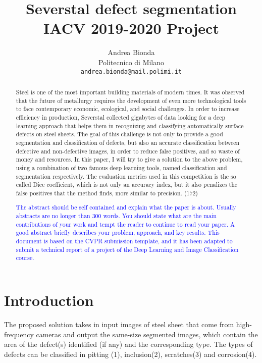 \documentclass[10pt,twocolumn,letterpaper]{article}
\begin{document}
\title{Severstal defect segmentation \\ IACV 2019-2020 Project} 

\author{Andrea Bionda\\
Politecnico di Milano\\
{\tt\small andrea.bionda@mail.polimi.it}}

\maketitle

\begin{abstract}
   Steel is one of the most important building materials of modern times. It was observed that the future of metallurgy requires the development of even more technological tools to face contemporary economic, ecological, and social challenges. 
   In order to increase efficiency in production, Severstal collected gigabytes of data looking for a deep learning approach that helps them in recognizing and classifying automatically surface defects on steel sheets.
   The goal of this challenge is not only to provide a good segmentation and classification of defects, but also an accurate classification between defective and non-defective images, in order to reduce false positives, and so waste of money and resources.
   In this paper, I will try to give a solution to the above problem, using a combination of two famous deep learning tools, named classification and segmentation respectively.
   The evaluation metrics used in this competition is the so called Dice coefficient, which is not only an accuracy index, but it also penalizes the false positives that the method finds, more similar to precision. (172)

   \textcolor{blue}{
   The abstract should be self contained and explain what the paper is about. Usually abstracts are no longer than 300 words. You should state what are the main contributions of your work and tempt the reader to continue to read your paper. A good abstract briefly describes your problem, approach, and key results. This document is based on the CVPR submission template, and it has been adapted to submit a technical report of a project of the Deep Learning and Image Classification course.}
\end{abstract}

\section{Introduction}
   The proposed solution takes in input images of steel sheet that come from high-frequency cameras and output the same-size segmented images, which contain the area of the defect(s) identified (if any) and the corresponding type. The types of defects can be classified in pitting (1), inclusion(2), scratches(3) and corrosion(4). \\
\end{document}
